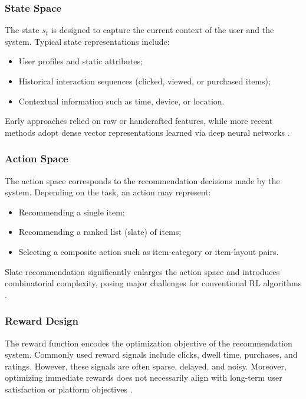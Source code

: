 \subsubsection{State Space}

The state $s_t$ is designed to capture the current context of the user and the system. Typical state representations include:
\begin{itemize}
    \item User profiles and static attributes;
    \item Historical interaction sequences (clicked, viewed, or purchased items);
    \item Contextual information such as time, device, or location.
\end{itemize}

Early approaches relied on raw or handcrafted features, while more recent methods adopt dense vector representations learned via deep neural networks \cite{Zhao2018SlateMDP}.

\subsubsection{Action Space}

The action space corresponds to the recommendation decisions made by the system. Depending on the task, an action may represent:
\begin{itemize}
    \item Recommending a single item;
    \item Recommending a ranked list (slate) of items;
    \item Selecting a composite action such as item-category or item-layout pairs.
\end{itemize}

Slate recommendation significantly enlarges the action space and introduces combinatorial complexity, posing major challenges for conventional RL algorithms \cite{Ie2019SlateQ}.

\subsubsection{Reward Design}

The reward function encodes the optimization objective of the recommendation system. Commonly used reward signals include clicks, dwell time, purchases, and ratings. However, these signals are often sparse, delayed, and noisy. Moreover, optimizing immediate rewards does not necessarily align with long-term user satisfaction or platform objectives \cite{Ie2019DeepExploration}.

